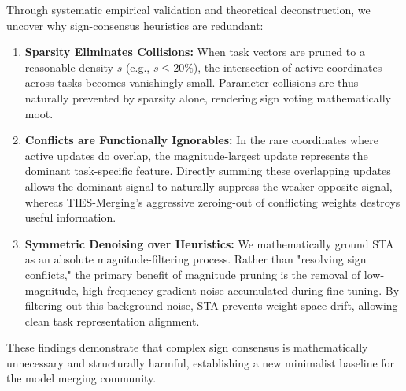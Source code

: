 Through systematic empirical validation and theoretical deconstruction, we uncover why sign-consensus heuristics are redundant:
\begin{enumerate}
    \item \textbf{Sparsity Eliminates Collisions:} When task vectors are pruned to a reasonable density $s$ (e.g., $s \le 20\%$), the intersection of active coordinates across tasks becomes vanishingly small. Parameter collisions are thus naturally prevented by sparsity alone, rendering sign voting mathematically moot.
    \item \textbf{Conflicts are Functionally Ignorables:} In the rare coordinates where active updates do overlap, the magnitude-largest update represents the dominant task-specific feature. Directly summing these overlapping updates allows the dominant signal to naturally suppress the weaker opposite signal, whereas TIES-Merging's aggressive zeroing-out of conflicting weights destroys useful information.
    \item \textbf{Symmetric Denoising over Heuristics:} We mathematically ground STA as an absolute magnitude-filtering process. Rather than "resolving sign conflicts," the primary benefit of magnitude pruning is the removal of low-magnitude, high-frequency gradient noise accumulated during fine-tuning. By filtering out this background noise, STA prevents weight-space drift, allowing clean task representation alignment.
\end{enumerate}

These findings demonstrate that complex sign consensus is mathematically unnecessary and structurally harmful, establishing a new minimalist baseline for the model merging community.
